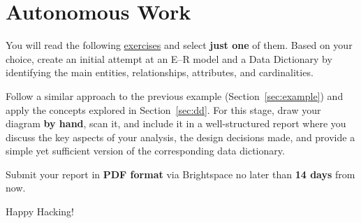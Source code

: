 \documentclass{article}
\begin{document}
\section{Autonomous Work}
You will read the following \href{https://drive.google.com/file/d/1TOvNSZZsybj1skLCpOxLtpr8b5A3Zb_6/view?usp=sharing}{exercises} and select \textbf{\large just one} of them. Based on your choice, create an initial attempt at an E--R model and a Data Dictionary by identifying the main entities, relationships, attributes, and cardinalities.

Follow a similar approach to the previous example (Section~\ref{sec:example}) and apply the concepts explored in Section~\ref{sec:dd}. For this stage, draw your diagram \textbf{by hand}, scan it, and include it in a well-structured report where you discuss the key aspects of your analysis, the design decisions made, and provide a simple yet sufficient version of the corresponding data dictionary.

Submit your report in \textbf{PDF format} via Brightspace\texttrademark{} no later than
\textbf{14 days} from now.


\vspace{5mm}
Happy Hacking! 
\end{document}
